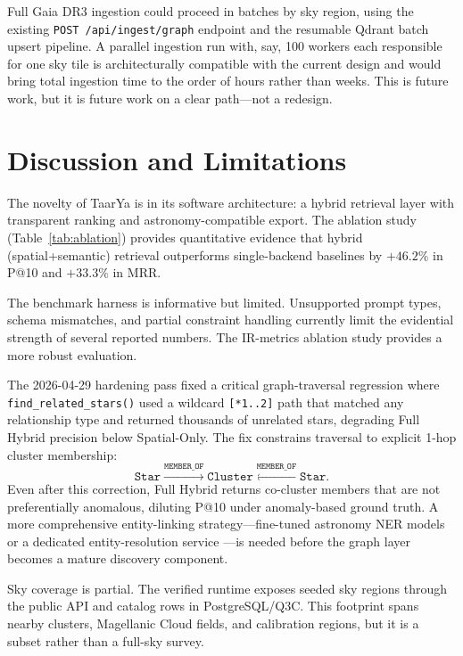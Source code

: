 \documentclass[12pt]{elsarticle}
\begin{document}
Full Gaia DR3 ingestion could proceed in batches by sky region, using the existing \texttt{POST /api/ingest/graph} endpoint and the resumable Qdrant batch upsert pipeline. A parallel ingestion run with, say, 100 workers each responsible for one sky tile is architecturally compatible with the current design and would bring total ingestion time to the order of hours rather than weeks. This is future work, but it is future work on a clear path---not a redesign.

\section{Discussion and Limitations}
\label{sec:discussion}

The novelty of \textsf{TaarYa} is in its software architecture: a hybrid retrieval layer with transparent ranking and astronomy-compatible export. The ablation study (Table~\ref{tab:ablation}) provides quantitative evidence that hybrid (spatial+semantic) retrieval outperforms single-backend baselines by $+46.2\%$ in P@10 and $+33.3\%$ in MRR.

The benchmark harness is informative but limited. Unsupported prompt types, schema mismatches, and partial constraint handling currently limit the evidential strength of several reported numbers. The IR-metrics ablation study provides a more robust evaluation.

The 2026-04-29 hardening pass fixed a critical graph-traversal regression where \texttt{find\allowbreak\_related\allowbreak\_stars()} used a wildcard \texttt{[*1..2]} path that matched any relationship type and returned thousands of unrelated stars, degrading Full Hybrid precision below Spatial-Only. The fix constrains traversal to explicit 1-hop cluster membership:
\[
\texttt{Star}\xrightarrow{\texttt{MEMBER\_OF}}\texttt{Cluster}\xleftarrow{\texttt{MEMBER\_OF}}\texttt{Star}.
\]
Even after this correction, Full Hybrid returns co-cluster members that are not preferentially anomalous, diluting P@10 under anomaly-based ground truth. A more comprehensive entity-linking strategy---fine-tuned astronomy NER models or a dedicated entity-resolution service \citep{Shen2015}---is needed before the graph layer becomes a mature discovery component.

Sky coverage is partial. The verified runtime exposes \nClusterNodes{} seeded sky regions through the public API and \nStarsReal{} catalog rows in PostgreSQL/Q3C. This footprint spans nearby clusters, Magellanic Cloud fields, and calibration regions, but it is a subset rather than a full-sky survey.
\end{document}
